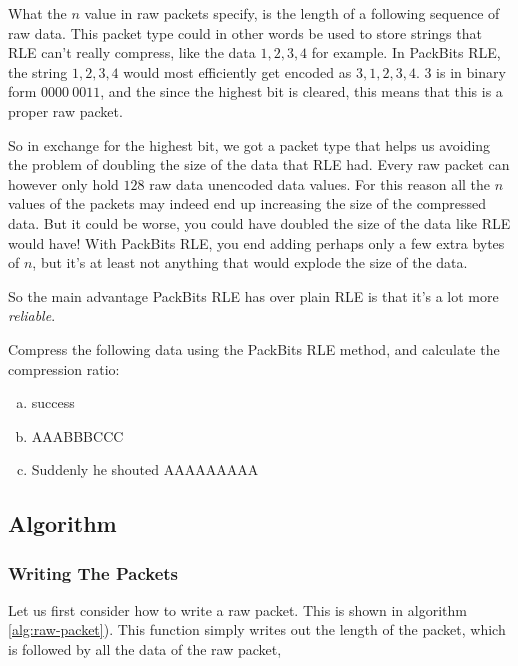 What the $n$ value in raw packets specify, is the length of a
following sequence of raw data. This packet type could in other words
be used to store strings that RLE can't really compress, like the data
$1,2,3,4$ for example. In PackBits RLE, the string $1,2,3,4$ would
most efficiently get encoded as $3,1,2,3,4$. $3$ is in binary form
$0000\ 0011$, and the since the highest bit is cleared, this means
that this is a proper raw packet.

So in exchange for the highest bit, we got a packet type that helps us
avoiding the problem of doubling the size of the data that RLE
had. Every raw packet can however only hold $128$ raw data unencoded
data values. For this reason all the $n$ values of the packets may
indeed end up increasing the size of the compressed data. But it could
be worse, you could have doubled the size of the data like RLE would
have! With PackBits RLE, you end adding perhaps only a few extra bytes
of $n$, but it's at least not anything that would explode the size of
the data.

So the main advantage PackBits RLE has over plain RLE is that it's a
lot more \textit{reliable}.

\begin{Exercise}[label={packbits-rle}]

  Compress the following data using the PackBits RLE method, and
  calculate the compression ratio:

  \begin{enumerate}[(a)]
  \item success
  \item AAABBBCCC
  \item Suddenly he shouted AAAAAAAAA
  \end{enumerate}

\end{Exercise}

\subsection{Algorithm}

\subsubsection{Writing The Packets}

Let us first consider how to write a raw packet. This is shown in
algorithm \ref{alg:raw-packet}). This function simply writes out the
length of the packet, which is followed by all the data of the raw
packet,

